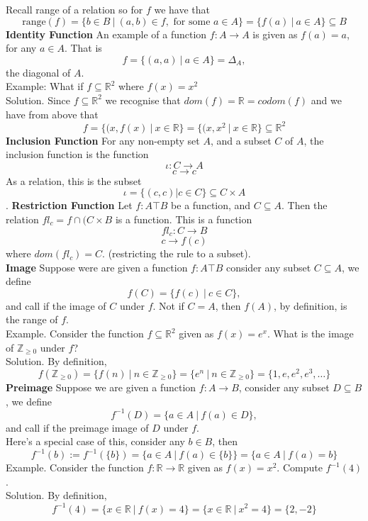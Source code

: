 \documentclass{article}
\begin{document}
Recall range of a relation so for \(f\) we have that 
\[\mathrm{range}(f) = \{b \in B\ \vert\ (a,b) \in f,\text{ for some $a \in A$}\} = \{f(a)\ \vert\  a \in A\} \subseteq B\]
\textbf{Identity Function} An example of a function \(f: A \to A\) is given as \(f(a) = a\), for any \(a \in A\). That is 
\[f = \{(a,a)\ \vert\ a \in A\} = \Delta_A,\]
the diagonal of \(A\).\\
Example: What if \(f \subseteq \mathbb{R}^2\) where \(f(x) = x^2\)\\
Solution. Since \(f \subseteq \mathbb{R}^2\) we recognise that \(dom(f) = \mathbb{R} = codom(f)\) and we have from above that
\[f = \{(x,f(x)\ \vert\ x\in \mathbb{R}\} = \{(x,x^2\ \vert\ x\in \mathbb{R}\} \subseteq \mathbb{R}^2\]
\textbf{Inclusion Function} For any non-empty set \(A\), and a subset \(C\) of \(A\), the inclusion function is the function
\[\iota: C \to A\]
\[c \to c\]
As a relation, this is the subset 
\[\iota = \{(c,c) \vert c \in C\} \subseteq C \times A\].
\textbf{Restriction Function}
Let \(f: A \top B\) be a function, and \(C \subseteq A\). Then the relation \(fl_c = f \cap (C \times B\) is a function. This is a function 
\[fl_c: C \to B\]
\[c \to f(c)\]
where \(dom(fl_c) = C\). (restricting the rule to a subset).\\
\textbf{Image} Suppose were are given a function \(f: A \top B\) consider any subset \(C \subseteq A\), we define 
\[f(C) = \{f(c)\ \vert\ c \in C\},\]
and call if the image of \(C\) under \(f\). Not if \(C = A\), then \(f(A)\), by definition, is the range of \(f\).\\
Example. Consider the function \(f \subseteq \mathbb{R}^2\) given as \(f(x) = e^x\). What is the image of \(\mathbb{Z}_{\geq 0}\) under \(f\)?\\
Solution. By definition,
\[f(\mathbb{Z}_{\geq 0}) = \{f(n)\ \vert\ n \in \mathbb{Z}_{\geq 0}\} = \{e^n\ \vert\ n \in \mathbb{Z}_{\geq 0}\} = \{1,e,e^2,e^3,\ldots\}\]
\textbf{Preimage} Suppose we are given a function \(f: A \to B\), consider any subset \(D \subseteq B\), we define 
\[f^{-1}(D) = \{a \in A\ \vert\ f(a) \in D\},\]
and call if the preimage image of \(D\) under \(f\).\\
Here's a special case of this, consider any \(b \in B\), then
\[f^{-1}(b) := f^{-1}(\{b\}) = \{a \in A\ \vert\ f(a) \in \{b\}\} = \{a \in A\ \vert\ f(a) = b\}\]
Example. Consider the function \(f: \mathbb{R} \to \mathbb{R}\) given as \(f(x) = x^2\). Compute \(f^{-1}(4)\).\\
Solution. By definition,
\[f^{-1}(4) = \{x \in \mathbb{R}\ \vert\ f(x) = 4\} = \{x \in \mathbb{R}\ \vert\ x^2 = 4\} = \{2,-2\}\]
\end{document}
